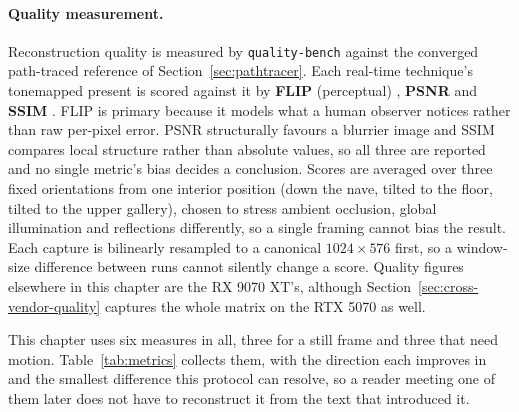 \paragraph{Quality measurement.} Reconstruction quality is measured by \texttt{quality-bench} against
the converged path-traced reference of Section~\ref{sec:pathtracer}. Each real-time technique's
tonemapped present is scored against it by \textbf{FLIP} (perceptual) \cite{andersson2020flip},
\textbf{PSNR} and \textbf{SSIM} \cite{wang2004ssim}. FLIP is primary because it models what a human
observer notices rather than raw per-pixel error. PSNR structurally favours a blurrier image and SSIM compares local structure rather
than absolute values, so all three are reported and no single metric's bias decides a conclusion.
Scores are averaged over three fixed orientations from one interior position (down the nave, tilted
to the floor, tilted to the upper gallery), chosen to stress ambient occlusion, global illumination
and reflections differently, so a single framing cannot bias the result. Each capture is bilinearly
resampled to a canonical $1024 \times 576$ first, so a window-size difference between runs cannot
silently change a score. Quality figures elsewhere in this chapter are
the RX 9070 XT's, although Section~\ref{sec:cross-vendor-quality} captures the whole matrix on the
RTX 5070 as well.

This chapter uses six measures in all, three for a still frame and three that need motion.
Table~\ref{tab:metrics} collects them, with the direction each improves in and the smallest
difference this protocol can resolve, so a reader meeting one of them later does not have to
reconstruct it from the text that introduced it.

